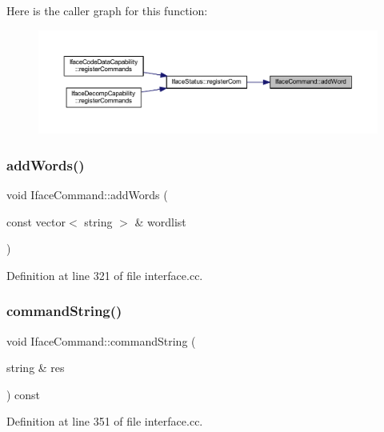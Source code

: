 Here is the caller graph for this function\+:
\nopagebreak
\begin{figure}[H]
\begin{center}
\leavevmode
\includegraphics[width=350pt]{class_iface_command_a6b4cf9ece6453e1436aad4f8ab49b9d4_icgraph}
\end{center}
\end{figure}
\mbox{\label{class_iface_command_afbbaea977f2a7cd6de3339a6a737e7a6}} 
\subsubsection{\texorpdfstring{addWords()}{addWords()}}
{\footnotesize\ttfamily void Iface\+Command\+::add\+Words (\begin{DoxyParamCaption}\item[{const vector$<$ string $>$ \&}]{wordlist }\end{DoxyParamCaption})}



Definition at line 321 of file interface.\+cc.

\mbox{\label{class_iface_command_a4ee3f097c09e0ede38ce8e37a64cb458}} 
\subsubsection{\texorpdfstring{commandString()}{commandString()}}
{\footnotesize\ttfamily void Iface\+Command\+::command\+String (\begin{DoxyParamCaption}\item[{string \&}]{res }\end{DoxyParamCaption}) const}



Definition at line 351 of file interface.\+cc.

